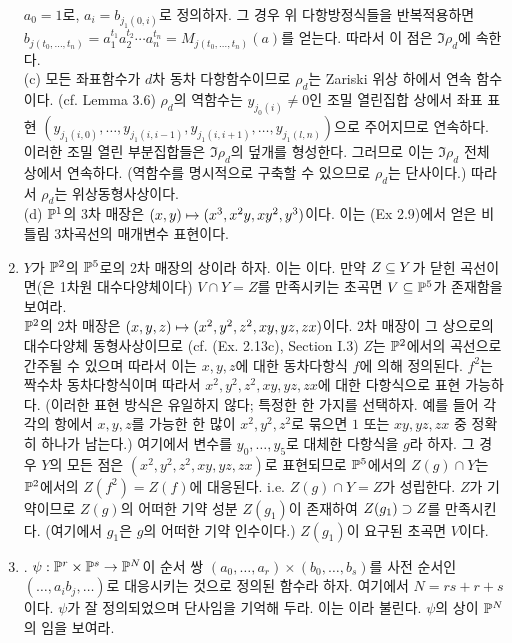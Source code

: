 \begin{enumerate}[label=\tb{2.\arabic*.},itemindent=0mm,itemsep=4mm]
		$a_0=1$로, $a_i=b_{j_1(0,i)}$로 정의하자. 그 경우 위 다항방정식들을 반복적용하면 $b_{j(t_0,\ldots,t_n)}
		=a_1^{t_1}a_2^{t_2}\cdots a_n^{t_n}=M_{j(t_0,\ldots,t_n)}(a)$를 얻는다. 따라서 이 점은 $\Im\rho_d$에 속한다.\\
		(c) 모든 좌표함수가 $d$차 동차 다항함수이므로 $\rho_d$는 Zariski 위상 하에서 연속 함수이다. (cf. Lemma 3.6)
		$\rho_d$의 역함수는 $y_{j_0(i)}\ne 0$인 조밀 열린집합 상에서 좌표 표현
		$(y_{j_1(i,0)},\ldots,y_{j_1(i,i-1)},y_{j_1(i,i+1)},\ldots,y_{j_1(l,n)})$으로 주어지므로 연속하다.
		이러한 조밀 열린 부분집합들은 $\Im\rho_d$의 덮개를 형성한다. 그러므로 이는 $\Im\rho_d$ 전체 상에서 연속하다.
		(역함수를 명시적으로 구축할 수 있으므로 $\rho_d$는 단사이다.) 따라서 $\rho_d$는 위상동형사상이다.\\
		(d) $\mathbb{P}^1$의 3차 매장은 $(x,y)\mapsto(x^3,x^2y,xy^2,y^3)$이다. 이는 (Ex 2.9)에서 얻은 비틀림 3차곡선의 매개변수 표현이다.
		\item $Y$가 $\mathbb{P}^2$의 $\mathbb{P}^5$로의 2차 매장의 상이라 하자. 이는 이다.
		만약 $Z\subseteq Y$가 닫힌 곡선이면(은 1차원 대수다양체이다)
		$V\cap Y=Z$를 만족시키는 초곡면 $V\subseteq\mathbb{P}^5$가 존재함을 보여라.\\
		\sol $\mathbb{P}^2$의 2차 매장은 $(x,y,z)\mapsto(x^2,y^2,z^2,xy,yz,zx)$이다.
		2차 매장이 그 상으로의 대수다양체 동형사상이므로 (cf. (Ex. 2.13c), Section I.3)
		$Z$는 $\mathbb{P}^2$에서의 곡선으로 간주될 수 있으며 따라서 이는 $x,y,z$에 대한 동차다항식 $f$에 의해 정의된다.
		$f^2$는 짝수차 동차다항식이며 따라서 $x^2,y^2,z^2,xy,yz,zx$에 대한 다항식으로 표현 가능하다.
		(이러한 표현 방식은 유일하지 않다; 특정한 한 가지를 선택하자.
		예를 들어 각각의 항에서 $x,y,z$를 가능한 한 많이 $x^2,y^2,z^2$로 묶으면 $1$ 또는 $xy,yz,zx$ 중 정확히 하나가 남는다.)
		여기에서 변수를 $y_0,\ldots,y_5$로 대체한 다항식을 $g$라 하자.
		그 경우 $Y$의 모든 점은 $(x^2,y^2,z^2,xy,yz,zx)$로 표현되므로 $\mathbb{P}^5$에서의 $Z(g)\cap Y$는
		$\mathbb{P}^2$에서의 $Z(f^2)=Z(f)$에 대응된다. i.e. $Z(g)\cap Y=Z$가 성립한다.
		$Z$가 기약이므로 $Z(g)$의 어떠한 기약 성분 $Z(g_1)$이 존재하여 $Z(g_1)\supset Z$를 만족시킨다. 
		(여기에서 $g_1$은 $g$의 어떠한 기약 인수이다.) $Z(g_1)$이 요구된 초곡면 $V$이다.
		\item {}. $\psi:\mathbb{P}^r\times\mathbb{P}^s\rightarrow\mathbb{P}^N$이 순서 쌍 $(a_0,\ldots,a_r)\times(b_0,\ldots,b_s)$를
		사전 순서인 $(\ldots,a_ib_j,\ldots)$로 대응시키는 것으로 정의된 함수라 하자. 여기에서 $N=rs+r+s$이다.
		$\psi$가 잘 정의되었으며 단사임을 기억해 두라. 이는 이라 불린다.
		$\psi$의 상이 $\mathbb{P}^N$의 임을 보여라.

\end{enumerate}
